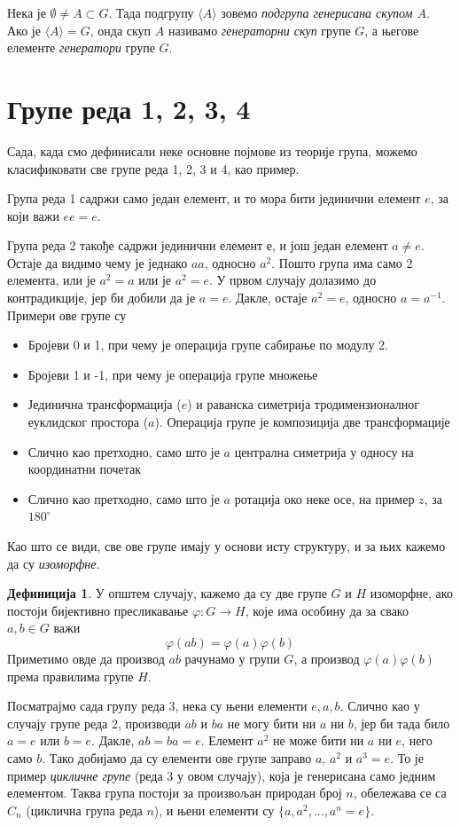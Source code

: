 \documentclass{report}
\theoremstyle{plain}
\theoremstyle{definition}
\newtheorem*{defn}{Дефиниција}
\begin{document}
Нека је $\emptyset \neq A\subset G$. Тада подгрупу $\langle A\rangle$ зовемо \emph{подгрупа генерисана скупом $A$}. Ако је $\langle A\rangle=G$, онда скуп $A$ називамо \emph{генераторни скуп} групе $G$, а његове елементе \emph{генератори} групе $G$.

\section{Групе реда 1, 2, 3, 4}

Сада, када смо дефинисали неке основне појмове из теорије група, можемо класификовати све групе реда 1, 2, 3 и 4, као пример.

Група реда 1 садржи само један елемент, и то мора бити јединични елемент $e$, за који важи $ee=e$.

Група реда 2 такође садржи јединични елемент $е$, и још један елемент $a\neq e$. Остаје да видимо чему је једнако $aa$, односно $a^2$. Пошто група има само 2 елемента, или је $a^2 = a$ или је $a^2=e$. У првом случају долазимо до контрадикције, јер би добили да је $a=e$. Дакле, остаје $a^2=e$, односно $a=a^{-1}$. Примери ове групе су
\begin{itemize}
  \item Бројеви 0 и 1, при чему је операција групе сабирање по модулу 2.
  \item Бројеви 1 и -1, при чему је операција групе множење
  \item Јединична трансформација ($e$) и раванска симетрија тродимензионалног еуклидског простора ($a$). Операција групе је композиција две трансформације
  \item Слично као претходно, само што је $a$ централна симетрија у односу на координатни почетак
  \item Слично као претходно, само што је $a$ ротација око неке осе, на пример $z$, за $180^\circ$
\end{itemize}
Као што се види, све ове групе имају у основи исту структуру, и за њих кажемо да су \emph{изоморфне}.

\begin{defn}
У општем случају, кажемо да су две групе $G$ и $H$ изоморфне, ако постоји бијективно пресликавање $\varphi: G\to H$, које има особину да за свако $a, b\in G$ важи $$\varphi(ab) = \varphi(a)\varphi(b)$$
Приметимо овде да производ $ab$ рачунамо у групи $G$, а производ $\varphi(a)\varphi(b)$ према правилима групе $H$.
\end{defn}

Посматрајмо сада групу реда 3, нека су њени елементи $e, a, b$. Слично као у случају групе реда 2, производи $ab$ и $ba$ не могу бити ни $a$ ни $b$, јер би тада било $a=e$ или $b=e$. Дакле, $ab = ba = e$. Елемент $a^2$ не може бити ни $a$ ни $e$, него само $b$. Тако добијамо да су елементи ове групе заправо $a$, $a^2$ и $a^3 = e$. То је пример \emph{цикличне групе} (реда 3 у овом случају), која је генерисана само једним елементом. Таква група постоји за произвољан природан број $n$, обележава се са $C_n$ (циклична група реда $n$), и њени елементи су $\{a, a^2, ..., a^n = e\}$.
\end{document}
